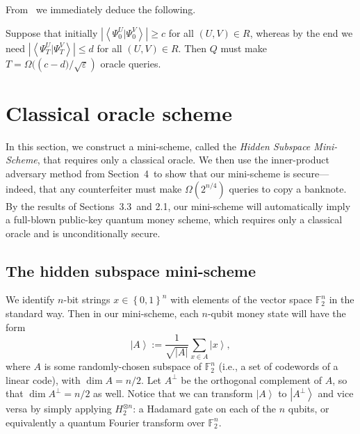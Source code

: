 {}From \ we immediately deduce the following.

\begin{theorem}
\label{lbthm}Suppose that initially
$\left\vert \left\langle \Psi_{0}^{U}|\Psi_{0}^{V}\right\rangle \right\vert
\geq c$ for all $\left(  U,V\right)  \in R$, whereas by the end we need
$\left\vert \left\langle \Psi_{T}^{U}|\Psi_{T}^{V}\right\rangle \right\vert
\leq d$ for all $\left(  U,V\right)  \in R$. Then $Q$ must make
$T=\Omega(({c-d)}/{\sqrt{\varepsilon}})  $ oracle queries.
\end{theorem}

\section{Classical oracle scheme\label{COR}}

In this section, we construct a mini-scheme, called the \emph{Hidden
Subspace Mini-Scheme}, that requires only a classical oracle. We then use
the inner-product adversary method from Section~4\ to show that our
mini-scheme is secure---indeed, that any counterfeiter must make
$\Omega\left(  2^{n/4}\right)  $ queries to copy a banknote. By the results
of Sections~3.3\ and 2.1, our mini-scheme will
automatically imply a full-blown public-key quantum money scheme, which
requires only a classical oracle and is unconditionally secure.

\subsection{The hidden subspace mini-scheme\label{HSM}}

We identify $n$-bit strings $x\in\left\{  0,1\right\}  ^{n}$ with elements of
the vector space $\mathbb{F}_{2}^{n}$ in the standard way. Then in our
mini-scheme, each $n$-qubit money state will have the form%
\[
\left\vert A\right\rangle :=\frac{1}{\sqrt{\left\vert A\right\vert }}%
\sum_{x\in A}\left\vert x\right\rangle ,
\]
where $A$ is some randomly-chosen subspace of $\mathbb{F}_{2}^{n}$ (i.e., a
set of codewords of a linear code), with $\dim A=n/2$. Let $A^{\bot}$ be
the orthogonal complement of $A$, so that $\dim A^{\bot}=n/2$ as
well. Notice that we can transform $\left\vert A\right\rangle $ to
$\left\vert A^{\bot}\right\rangle $ and vice versa by simply applying
$H_{2}^{\otimes n}$: a Hadamard gate on each of the $n$ qubits, or
equivalently a quantum Fourier transform over $\mathbb{F}_{2}^{n}$.


